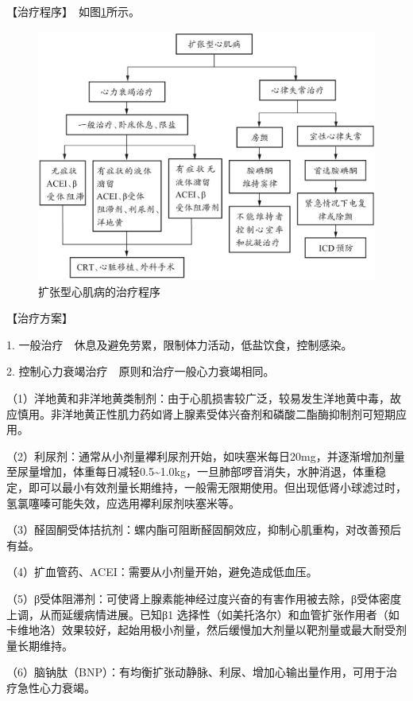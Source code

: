【治疗程序】　如图\ref{fig2-13-1}所示。

\begin{figure}[!htbp]
 \centering
 \includegraphics{./images/Image00080.jpg}
 \captionsetup{justification=centering}
 \caption{扩张型心肌病的治疗程序}
 \label{fig2-13-1}
  \end{figure} 

【治疗方案】

1. 一般治疗　休息及避免劳累，限制体力活动，低盐饮食，控制感染。

2. 控制心力衰竭治疗　原则和治疗一般心力衰竭相同。

（1）洋地黄和非洋地黄类制剂：由于心肌损害较广泛，较易发生洋地黄中毒，故应慎用。非洋地黄正性肌力药如肾上腺素受体兴奋剂和磷酸二酯酶抑制剂可短期应用。

（2）利尿剂：通常从小剂量襻利尿剂开始，如呋塞米每日20mg，并逐渐增加剂量至尿量增加，体重每日减轻0.5\textasciitilde{}1.0kg，一旦肺部啰音消失，水肿消退，体重稳定，即可以最小有效剂量长期维持，一般需无限期使用。但出现低肾小球滤过时，氢氯噻嗪可能失效，应选用襻利尿剂呋塞米等。

（3）醛固酮受体拮抗剂：螺内酯可阻断醛固酮效应，抑制心肌重构，对改善预后有益。

（4）扩血管药、ACEI：需要从小剂量开始，避免造成低血压。

（5）β受体阻滞剂：可使肾上腺素能神经过度兴奋的有害作用被去除，β受体密度上调，从而延缓病情进展。已知β{1}
选择性（如美托洛尔）和血管扩张作用者（如卡维地洛）效果较好，起始用极小剂量，然后缓慢加大剂量以靶剂量或最大耐受剂量长期维持。

（6）脑钠肽（BNP）：有均衡扩张动静脉、利尿、增加心输出量作用，可用于治疗急性心力衰竭。

